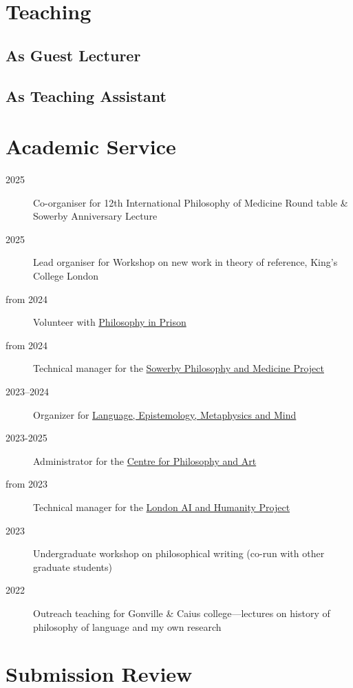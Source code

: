 \documentclass{cv}
\begin{document}
\section*{Teaching}
\subsection*{As Guest Lecturer}
\printbibliography[check=Teaching+GuestLecturer]{}

\subsection*{As Teaching Assistant}
\printbibliography[check=Teaching+TA]{}

\section*{Academic Service}
\begin{description}
\item[{2025}] Co-organiser for 12th International Philosophy of
Medicine Round table \& Sowerby Anniversary Lecture
\item[{2025}] Lead organiser for Workshop on new work in theory of reference, King's College London
\item[{from 2024}] Volunteer with \href{https://www.philosophyinprison.com/}{Philosophy in Prison}
\item[{from 2024}] Technical manager for the \href{https://www.philosophyandmedicine.org/}{Sowerby Philosophy and
Medicine Project}
\item[{2023--2024}] Organizer for \href{https://www.lemm-london.co.uk/}{Language, Epistemology, Metaphysics and Mind}
\item[{2023-2025}] Administrator for the \href{https://philosophyarts.co.uk/}{Centre for Philosophy and Art}
\item[{from 2023}] Technical manager for the \href{https://www.ai-humanity-london.com/}{London AI and Humanity Project}
\item[{2023}] Undergraduate workshop on philosophical writing (co-run with other graduate students)
\item[{2022}] Outreach teaching for Gonville \& Caius college---lectures on
history of philosophy of language and my own research
\end{description}

\section*{Submission Review}
\end{document}
